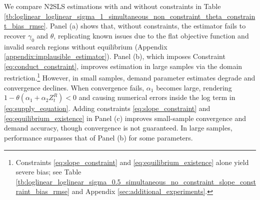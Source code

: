 \documentclass[11pt, a4paper]{article}
\theoremstyle{remark}
\begin{document}

We compare N2SLS estimations with and without constraints in Table \ref{tb:loglinear_loglinear_sigma_1_simultaneous_non_constraint_theta_constraint_bias_rmse}.
Panel (a) shows that, without constraints, the estimator fails to recover $\gamma_0$ and $\theta$, replicating known issues due to the flat objective function and invalid search regions without equilibrium (Appendix \ref{appendix:implausible_estimator}).
Panel (b), which imposes Constraint \eqref{eq:conduct_constraint}, improves estimation in large samples via the domain restriction.\footnote{Constraints \eqref{eq:slope_constraint} and \eqref{eq:equilibrium_existence} alone yield severe bias; see Table \ref{tb:loglinear_loglinear_sigma_0.5_simultaneous_no_constraint_slope_constraint_bias_rmse} and Appendix \ref{sec:additional_experiments}.}
However, in small samples, demand parameter estimates degrade and convergence declines. When convergence fails, $\alpha_1$ becomes large, rendering $1 - \theta(\alpha_1 + \alpha_2 Z^R_t) < 0$ and causing numerical errors inside the log term in \eqref{eq:supply_equation}.
Adding constraints \eqref{eq:slope_constraint} and \eqref{eq:equilibrium_existence} in Panel (c) improves small-sample convergence and demand accuracy, though convergence is not guaranteed. 
In large samples, performance surpasses that of Panel (b) for some parameters.
\end{document}
